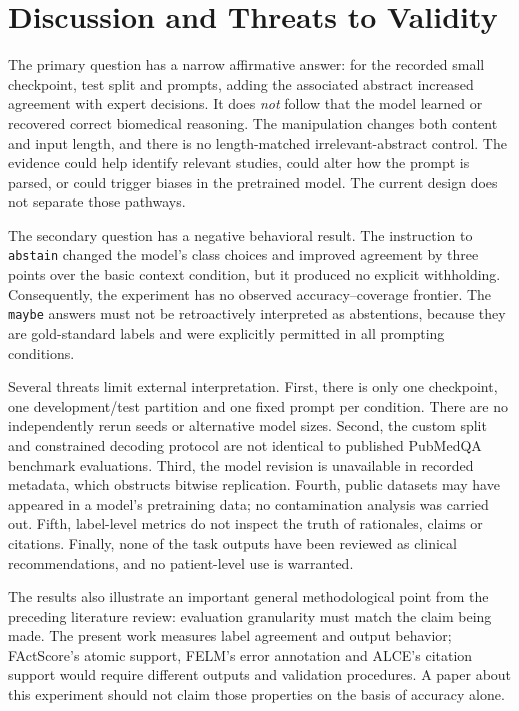 \documentclass[conference]{IEEEtran}
\begin{document}
\section{Discussion and Threats to Validity}
The primary question has a narrow affirmative answer: for the recorded small checkpoint, test split and prompts, adding the associated abstract increased agreement with expert decisions. It does \emph{not} follow that the model learned or recovered correct biomedical reasoning. The manipulation changes both content and input length, and there is no length-matched irrelevant-abstract control. The evidence could help identify relevant studies, could alter how the prompt is parsed, or could trigger biases in the pretrained model. The current design does not separate those pathways.

The secondary question has a negative behavioral result. The instruction to \texttt{abstain} changed the model's class choices and improved agreement by three points over the basic context condition, but it produced no explicit withholding. Consequently, the experiment has no observed accuracy--coverage frontier. The \texttt{maybe} answers must not be retroactively interpreted as abstentions, because they are gold-standard labels and were explicitly permitted in all prompting conditions.

Several threats limit external interpretation. First, there is only one checkpoint, one development/test partition and one fixed prompt per condition. There are no independently rerun seeds or alternative model sizes. Second, the custom split and constrained decoding protocol are not identical to published PubMedQA benchmark evaluations. Third, the model revision is unavailable in recorded metadata, which obstructs bitwise replication. Fourth, public datasets may have appeared in a model's pretraining data; no contamination analysis was carried out. Fifth, label-level metrics do not inspect the truth of rationales, claims or citations. Finally, none of the task outputs have been reviewed as clinical recommendations, and no patient-level use is warranted.

The results also illustrate an important general methodological point from the preceding literature review: evaluation granularity must match the claim being made. The present work measures label agreement and output behavior; FActScore's atomic support, FELM's error annotation and ALCE's citation support would require different outputs and validation procedures. A paper about this experiment should not claim those properties on the basis of accuracy alone.
\end{document}
